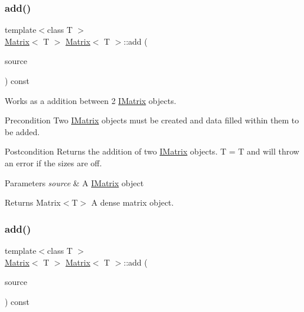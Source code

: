 \subsubsection{\texorpdfstring{add()}{add()}\hspace{0.1cm}{\footnotesize\ttfamily [5/6]}}
{\footnotesize\ttfamily template$<$class T $>$ \\
\mbox{\hyperlink{class_matrix}{Matrix}}$<$ T $>$ \mbox{\hyperlink{class_matrix}{Matrix}}$<$ T $>$\+::add (\begin{DoxyParamCaption}\item[{const \mbox{\hyperlink{class_i_matrix}{I\+Matrix}}$<$ \mbox{\hyperlink{class_s_matrix}{S\+Matrix}}$<$ T $>$, T $>$ \&}]{source }\end{DoxyParamCaption}) const}



Works as a addition between 2 \mbox{\hyperlink{class_i_matrix}{I\+Matrix}} objects. 

\begin{DoxyPrecond}{Precondition}
Two \mbox{\hyperlink{class_i_matrix}{I\+Matrix}} objects must be created and data filled within them to be added. 
\end{DoxyPrecond}
\begin{DoxyPostcond}{Postcondition}
Returns the addition of two \mbox{\hyperlink{class_i_matrix}{I\+Matrix}} objects. T = T and will throw an error if the sizes are off.
\end{DoxyPostcond}

\begin{DoxyParams}{Parameters}
{\em source} & A \mbox{\hyperlink{class_i_matrix}{I\+Matrix}} object \\
\hline
\end{DoxyParams}
\begin{DoxyReturn}{Returns}
Matrix$<$\+T$>$ A dense matrix object. 
\end{DoxyReturn}
\mbox{\label{class_matrix_a048e194afecce438b18ceab8b0ff64fc}} 
\subsubsection{\texorpdfstring{add()}{add()}\hspace{0.1cm}{\footnotesize\ttfamily [6/6]}}
{\footnotesize\ttfamily template$<$class T $>$ \\
\mbox{\hyperlink{class_matrix}{Matrix}}$<$ T $>$ \mbox{\hyperlink{class_matrix}{Matrix}}$<$ T $>$\+::add (\begin{DoxyParamCaption}\item[{const \mbox{\hyperlink{class_i_matrix}{I\+Matrix}}$<$ \mbox{\hyperlink{class_d_matrix}{D\+Matrix}}$<$ T $>$, T $>$ \&}]{source }\end{DoxyParamCaption}) const}



